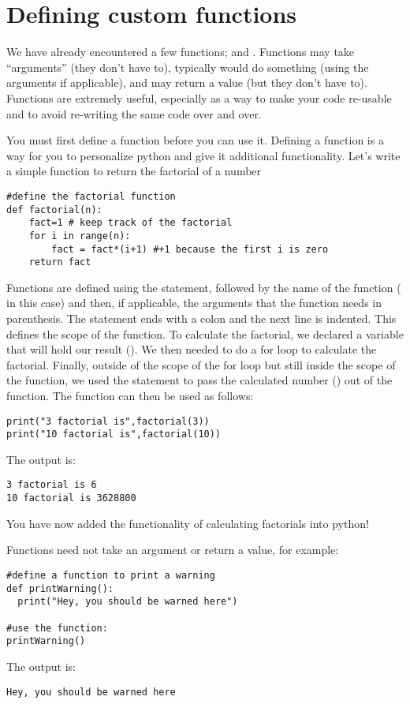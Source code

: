 \section{Defining custom functions}
We have already encountered a few functions;  and . Functions may take ``arguments'' (they don't have to), typically would do something (using the arguments if applicable), and may return a value (but they don't have to). Functions are extremely useful, especially as a way to make your code re-usable and to avoid re-writing the same code over and over. 

You must first define a function before you can use it. Defining a function is a way for you to personalize python and give it additional functionality. Let's write a simple function to return the factorial of a number
\begin{lstlisting}[frame=single] 
#define the factorial function
def factorial(n):
    fact=1 # keep track of the factorial
    for i in range(n):
        fact = fact*(i+1) #+1 because the first i is zero
    return fact
\end{lstlisting}
Functions are defined using the  statement, followed by the name of the function ( in this case) and then, if applicable, the arguments that the function needs in parenthesis. The statement ends with a colon and the next line is indented. This defines the scope of the function. To calculate the factorial, we declared a variable that will hold our result (). We then needed to do a for loop to calculate the factorial. Finally, outside of the scope of the for loop but still inside the scope of the function, we used the  statement to pass the calculated number () out of the function. The function can then be used as follows:
\begin{lstlisting}[frame=single] 
print("3 factorial is",factorial(3))
print("10 factorial is",factorial(10))
\end{lstlisting}
The output is:
\begin{verbatim}
3 factorial is 6
10 factorial is 3628800
\end{verbatim}
You have now added the functionality of calculating factorials into python!

Functions need not take an argument or return a value, for example:
\begin{lstlisting}[frame=single] 
#define a function to print a warning
def printWarning():
  print("Hey, you should be warned here")

#use the function:
printWarning()
\end{lstlisting}
The output is:
\begin{verbatim}
Hey, you should be warned here
\end{verbatim}

